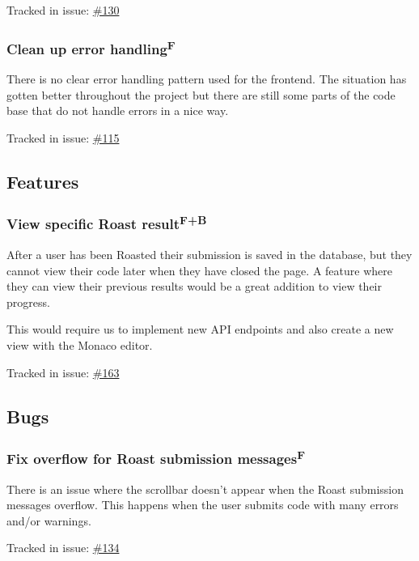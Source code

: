 \documentclass[12pt,a4paper]{report}
\begin{document}
Tracked in issue: \href{https://github.com/LuleaUniversityOfTechnology/2018-project-roaster/issues/130}{\#130}

\subsubsection{Clean up error handling\texorpdfstring{\textsuperscript{F}}{}}
There is no clear error handling pattern used for the frontend. The situation has gotten better throughout the project but there are still some parts of the code base that do not handle errors in a nice way.

Tracked in issue: \href{https://github.com/LuleaUniversityOfTechnology/2018-project-roaster/issues/115}{\#115}

\subsection*{Features}
\subsubsection{View specific Roast result\texorpdfstring{\textsuperscript{F+B}}{}}
After a user has been Roasted their submission is saved in the database, but they cannot view their code later when they have closed the page. A feature where they can view their previous results would be a great addition to view their progress.

This would require us to implement new API endpoints and also create a new view with the Monaco editor.

Tracked in issue: \href{https://github.com/LuleaUniversityOfTechnology/2018-project-roaster/issues/163}{\#163}

\subsection*{Bugs}
\subsubsection{Fix overflow for Roast submission messages\texorpdfstring{\textsuperscript{F}}{}}
There is an issue where the scrollbar doesn't appear when the Roast submission messages overflow. This happens when the user submits code with many errors and/or warnings.

Tracked in issue: \href{https://github.com/LuleaUniversityOfTechnology/2018-project-roaster/issues/134}{\#134}
\end{document}

